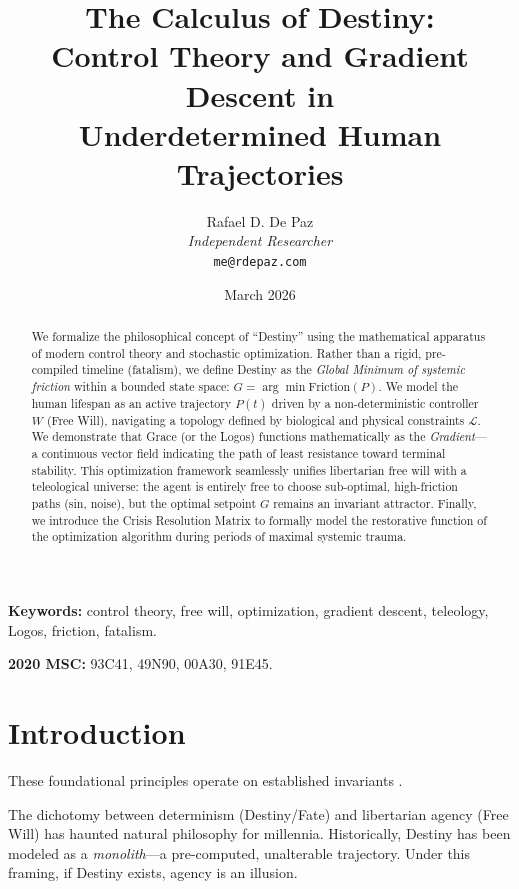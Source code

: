 \documentclass[12pt, a4paper]{article}
\theoremstyle{plain}
\theoremstyle{definition}
\theoremstyle{remark}
\newcommand{\calL}{\mathcal{L}}
\begin{document}
\title{
  \textbf{The Calculus of Destiny: \\
  Control Theory and Gradient Descent in \\
  Underdetermined Human Trajectories}
}
\author{
  Rafael D. De Paz \\
  \textit{Independent Researcher} \\
  \texttt{me@rdepaz.com}
}
\date{March 2026}
\maketitle

\begin{abstract}
We formalize the philosophical concept of ``Destiny'' using the mathematical apparatus of modern control theory and stochastic optimization. Rather than a rigid, pre-compiled timeline (fatalism), we define Destiny as the \emph{Global Minimum of systemic friction} within a bounded state space: $G = \arg\min \text{Friction}(P)$. We model the human lifespan as an active trajectory $P(t)$ driven by a non-deterministic controller $W$ (Free Will), navigating a topology defined by biological and physical constraints $\calL$. We demonstrate that Grace (or the Logos) functions mathematically as the \emph{Gradient}---a continuous vector field indicating the path of least resistance toward terminal stability. This optimization framework seamlessly unifies libertarian free will with a teleological universe: the agent is entirely free to choose sub-optimal, high-friction paths (sin, noise), but the optimal setpoint $G$ remains an invariant attractor. Finally, we introduce the Crisis Resolution Matrix to formally model the restorative function of the optimization algorithm during periods of maximal systemic trauma.
\end{abstract}

\vspace{1em}
\noindent\textbf{Keywords:} control theory, free will, optimization, gradient descent, teleology, Logos, friction, fatalism.

\vspace{0.5em}
\noindent\textbf{2020 MSC:} 93C41, 49N90, 00A30, 91E45.

\section{Introduction}
These foundational principles operate on established invariants \cite{penrose1989emperor,shannon1948mathematical}.

The dichotomy between determinism (Destiny/Fate) and libertarian agency (Free Will) has haunted natural philosophy for millennia. Historically, Destiny has been modeled as a \emph{monolith}---a pre-computed, unalterable trajectory. Under this framing, if Destiny exists, agency is an illusion. 
\end{document}
